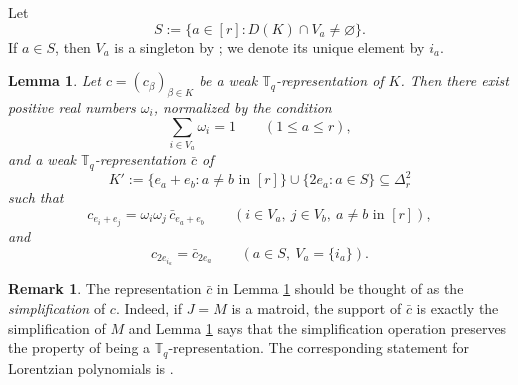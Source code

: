 \documentclass[12pt]{amsart}
\newtheorem{lemma}[theorem]{Lemma}
\theoremstyle{definition}
\newtheorem{remark}[theorem]{Remark}
\newcommand{\1}{\mathbf{1}}
\newcommand\T{{\mathbb T}}
\newcommand{\mk}[2][]{\todo[color=orange, #1]{\textbf{Mario}: #2}}
\newcommand\ol{\texorpdfstring{\textbf{Oliver:} }{Oliver: }}
\begin{document}
Let
\[
S:=\{a\in [r]:D(K)\cap V_a\ne\varnothing\}.
\]
If $a\in S$, then $V_a$ is a singleton by \cite[Lemma 4.5(1)]{BHKL1}; we denote its unique element by
$i_a$.


\begin{lemma}
\label{lem:quadratic-simplification}
Let $c=(c_\beta)_{\beta\in K}$ be a weak $\T_q$-representation of $K$.
Then there exist positive real numbers $\omega_i$, normalized by the condition
\[
\sum_{i\in V_a}\omega_i=1
\qquad (1\le a\le r),
\]
and a weak $\T_q$-representation $\bar c$ of
\[
K' :=
\{e_a+e_b:a\ne b\text{ in }[r]\}\cup \{2e_a:a\in S\}
\subseteq \Delta_r^2
\]
such that
\[
c_{e_i+e_j}
=
\omega_i\omega_j\,\bar c_{e_a+e_b}
\qquad
(i\in V_a,\ j\in V_b,\ a\ne b\text{ in }[r]),
\]
and
\[
c_{2e_{i_a}}=\bar c_{2e_a}
\qquad (a\in S,\ V_a=\{i_a\}).
\]
\end{lemma}


\begin{remark}
    The representation $\bar c$ in Lemma \ref{lem:quadratic-simplification} should be thought of as the \emph{simplification} of $c$.
    Indeed, if $J=M$ is a matroid, the support of $\bar c$ is exactly the simplification of $M$ and Lemma \ref{lem:quadratic-simplification} says that the simplification operation preserves the property of being a $\T_q$-representation. The corresponding statement for Lorentzian polynomials is \cite[Theorem 4.7]{BHKL1}.
\end{remark}
\end{document}
